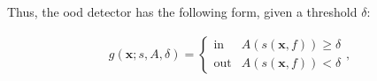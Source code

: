 \documentclass[UKenglish]{uiomasterthesis} %
\theoremstyle{definition}
\begin{document}
Thus, the \ac{ood} detector has the following form, given a threshold $\delta$:

\begin{align}
    g(\bm{x}; s, A, \delta)=\begin{cases} 
        \text{in } & A(s(\bm{x}, f)) \ge \delta \\
        \text{out} & A(s(\bm{x}, f)) < \delta 
   \end{cases},
\label{eq:aggregate}
\end{align}

%
%
%




%
%
%
%
\end{document}
